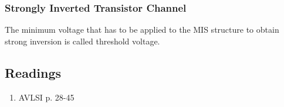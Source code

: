 \documentclass[main]{subfiles}
\begin{document}
\subsubsection{Strongly Inverted Transistor Channel}
The minimum voltage that has to be applied to the MIS structure to obtain
strong inversion is called threshold voltage.


\subsection{Readings}
\begin{enumerate}
\item AVLSI p. 28-45
\end{enumerate}

\end{document}
